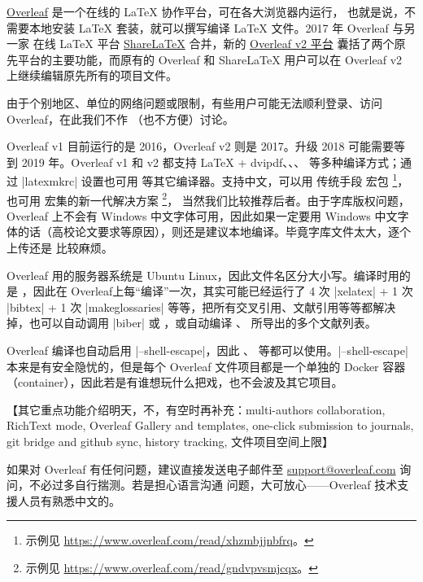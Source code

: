 


\href{https://www.overleaf.com}{Overleaf} 是一个在线的 \LaTeX{} 协作平台，可在各大浏览器内运行，
也就是说，不需要本地安装 \LaTeX{} 套装，就可以撰写编译 \LaTeX{} 文件。2017 年 Overleaf 与另一家
在线 \LaTeX{} 平台 \href{https://www.sharelatex.com}{ShareLaTeX} 合并，新的
\href{https://v2.overleaf.com}{Overleaf v2 平台} 囊括了两个原先平台的主要功能，而原有的 Overleaf 和
ShareLaTeX 用户可以在 Overleaf v2 上继续编辑原先所有的项目文件。

由于个别地区、单位的网络问题或限制，有些用户可能无法顺利登录、访问 Overleaf，在此我们不作
（也不方便）讨论。

Overleaf v1 目前运行的是 \TeXLive{} 2016，Overleaf v2 则是 \TeXLive{} 2017。升级 \TeXLive{} 2018
可能需要等到 2019 年。Overleaf v1 和 v2 都支持 \LaTeX{} + dvipdf、\pdfLaTeX{}、\XeLaTeX{}、
\LuaLaTeX{} 等多种编译方式；通过 |latexmkrc| 设置也可用 \pTeX{} 等其它编译器。支持中文，可以用
传统手段  宏包
\footnote{示例见 \url{https://www.overleaf.com/read/xhzmbjjnbfrq}。}，
也可用 \CTeX{} 宏集的新一代解决方案
\footnote{示例见 \url{https://www.overleaf.com/read/gndvpvsmjcqx}。}，
当然我们比较推荐后者。由于字库版权问题，Overleaf 上不会有 Windows 中文字体可用，因此如果一定要用
Windows 中文字体的话（高校论文要求等原因），则还是建议本地编译。毕竟字库文件太大，逐个上传还是
比较麻烦。

Overleaf 用的服务器系统是 Ubuntu Linux，因此文件名区分大小写。编译时用的是 ，因此在
Overleaf上每“编译”一次，其实可能已经运行了 4 次 |xelatex| + 1 次 |bibtex| + 1 次 |makeglossaries|
等等，把所有交叉引用、文献引用等等都解决掉，也可以自动调用 |biber| 或 ，或自动编译
、 所导出的多个文献列表。

Overleaf 编译也自动启用 |--shell-escape|，因此 、 
等都可以使用。|--shell-escape| 本来是有安全隐忧的，但是每个 Overleaf 文件项目都是一个单独的 Docker 
容器（container），因此若是有谁想玩什么把戏，也不会波及其它项目。

【其它重点功能介绍明天，不，有空时再补充：multi-authors collaboration, RichText mode,
Overleaf Gallery and templates, one-click submission to journals, git bridge and github sync,
history tracking, 文件项目空间上限】

如果对 Overleaf 有任何问题，建议直接发送电子邮件至
\href{mailto:support@overleaf.com}{support@overleaf.com} 询问，不必过多自行揣测。若是担心语言沟通
问题，大可放心——Overleaf 技术支援人员有熟悉中文的。

